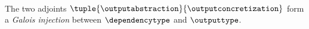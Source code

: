 ~

The two adjoints $\tuple{\outputabstraction}{\outputconcretization}$ form a \emph{Galois injection} between
$\dependencytype$ and $\outputtype$.
